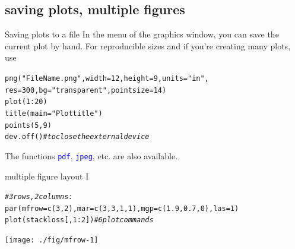 \documentclass[xcolor=table,           xcolor=dvipsnames]{beamer}\usepackage[]{graphicx}\usepackage[]{color}
\makeatletter
\newcommand{\hlnum}[1]{\textcolor[rgb]{0,0,0}{#1}}
\newcommand{\hlstr}[1]{\textcolor[rgb]{0.545,0.137,0.137}{#1}}
\newcommand{\hlcom}[1]{\textcolor[rgb]{0,0.392,0}{\textit{#1}}}
\newcommand{\hlopt}[1]{\textcolor[rgb]{0,0,0}{#1}}
\newcommand{\hlstd}[1]{\textcolor[rgb]{0,0,0}{#1}}
\newcommand{\hlkwc}[1]{\textcolor[rgb]{1,0,1}{#1}}
\newcommand{\hlkwd}[1]{\textcolor[rgb]{0,0,1}{#1}}
\newenvironment{kframe}{%
 \def\at@end@of@kframe{}%
 \ifinner\ifhmode%
  \def\at@end@of@kframe{\end{minipage}}%
  \begin{minipage}{\columnwidth}%
 \fi\fi%
 \def\FrameCommand##1{\hskip\@totalleftmargin \hskip-\fboxsep
 \colorbox{shadecolor}{##1}\hskip-\fboxsep
     \hskip-\linewidth \hskip-\@totalleftmargin \hskip\columnwidth}%
 \MakeFramed {\advance\hsize-\width
   \@totalleftmargin\z@ \linewidth\hsize
   \@setminipage}}%
 {\par\unskip\endMakeFramed%
 \at@end@of@kframe}
\newenvironment{knitrout}{}{} %
\newcommand{\rcode}[1]{\texttt{\textcolor{Blue}{#1}}} %
\makeatother
\begin{document}
\subsection{saving plots, multiple figures}

\begin{frame}[fragile]{Saving plots to a file}
In the menu of the graphics window, you can save the current plot by hand.
For reproducible sizes and if you're creating many plots, use
\pause
\begin{knitrout}
\color{fgcolor}\begin{kframe}
\begin{alltt}
\hlkwd{png}\hlstd{(}\hlstr{"FileName.png"}\hlstd{,} \hlkwc{width}\hlstd{=}\hlnum{12}\hlstd{,} \hlkwc{height}\hlstd{=}\hlnum{9}\hlstd{,} \hlkwc{units}\hlstd{=}\hlstr{"in"}\hlstd{,}
           \hlkwc{res}\hlstd{=}\hlnum{300}\hlstd{,} \hlkwc{bg}\hlstd{=}\hlstr{"transparent"}\hlstd{,} \hlkwc{pointsize}\hlstd{=}\hlnum{14}\hlstd{)}
  \hlkwd{plot}\hlstd{(}\hlnum{1}\hlopt{:}\hlnum{20}\hlstd{)}
  \hlkwd{title}\hlstd{(}\hlkwc{main}\hlstd{=}\hlstr{"Plot title"}\hlstd{)}
  \hlkwd{points}\hlstd{(}\hlnum{5}\hlstd{,}\hlnum{9}\hlstd{)}
\hlkwd{dev.off}\hlstd{()} \hlcom{# to close the external device}
\end{alltt}
\end{kframe}
\end{knitrout}
\pause
The functions \rcode{pdf}, \rcode{jpeg}, etc. are also available.
\end{frame}


\begin{frame}[fragile]{multiple figure layout I}
\vspace{-1em}
\begin{knitrout}
\color{fgcolor}\begin{kframe}
\begin{alltt}
\hlcom{# 3 rows, 2 columns:}
\hlkwd{par}\hlstd{(}\hlkwc{mfrow}\hlstd{=}\hlkwd{c}\hlstd{(}\hlnum{3}\hlstd{,}\hlnum{2}\hlstd{),} \hlkwc{mar}\hlstd{=}\hlkwd{c}\hlstd{(}\hlnum{3}\hlstd{,}\hlnum{3}\hlstd{,}\hlnum{1}\hlstd{,}\hlnum{1}\hlstd{),} \hlkwc{mgp}\hlstd{=}\hlkwd{c}\hlstd{(}\hlnum{1.9}\hlstd{,} \hlnum{0.7}\hlstd{,} \hlnum{0}\hlstd{),} \hlkwc{las}\hlstd{=}\hlnum{1}\hlstd{)}
\hlkwd{plot}\hlstd{(stackloss[ ,}\hlnum{1}\hlopt{:}\hlnum{2}\hlstd{])} \hlcom{# 6 plot commands}
\end{alltt}
\end{kframe}

{\centering \texttt{[image: ./fig/mfrow-1]} 

}



\end{knitrout}
\end{frame}
\end{document}
